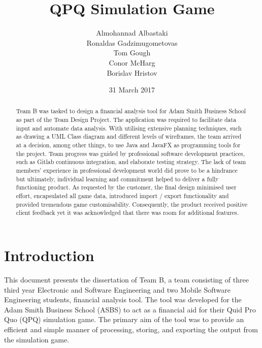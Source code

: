 \documentclass{l3proj}
\begin{document}
\title{QPQ Simulation Game}

\author{Almohannad Albastaki \\
        Ronaldas Gadzimugometovas \\
        Tom Gough \\
     	Conor McHarg \\
        Borislav Hristov}

\date{31 March 2017}

\maketitle

\begin{abstract}

Team B was tasked to design a financial analysis tool for Adam Smith Business School as part of the Team Design Project. The application was required to facilitate data input and automate data analysis. With utilising extensive planning techniques, such as drawing a UML Class diagram and different levels of wireframes, the team arrived at a decision, among other things, to use Java and JavaFX as programming tools for the project. Team progress was guided by professional software development practices, such as Gitlab continuous integration, and elaborate testing strategy. The lack of team members' experience in professional development world did prove to be a hindrance but ultimately, individual learning and commitment helped to deliver a fully functioning product. As requested by the customer, the final design minimised user effort, encapsulated all game data, introduced import / export functionality and provided tremendous game customisability. Consequently, the product received positive client feedback yet it was acknowledged that there was room for additional features.

\end{abstract}

\educationalconsent

\newpage

\section{Introduction}
\label{sec:introduction}

This document presents the dissertation of Team B, a team consisting of three third year Electronic and Software Engineering and two Mobile Software Engineering students, financial analysis tool. The tool was developed for the Adam Smith Business School (ASBS) to act as a financial aid for their Quid Pro Quo (QPQ) simulation game. The primary aim of the tool was to provide an efficient and simple manner of processing, storing, and exporting the output from the simulation game.
\end{document}
